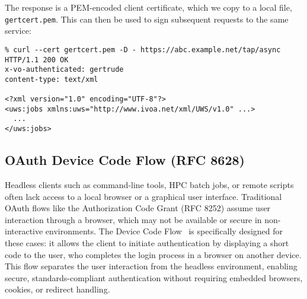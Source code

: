 \documentclass[11pt,a4paper]{ivoa}
\begin{document}
\noindent
The response is a PEM-encoded client certificate, which we copy
to a local file, \verb|gertcert.pem|.
This can then be used to sign subsequent requests to the same service:
{\footnotesize
\begin{verbatim}
% curl --cert gertcert.pem -D - https://abc.example.net/tap/async
HTTP/1.1 200 OK
x-vo-authenticated: gertrude
content-type: text/xml

<?xml version="1.0" encoding="UTF-8"?>
<uws:jobs xmlns:uws="http://www.ivoa.net/xml/UWS/v1.0" ...>
  ...
</uws:jobs>
\end{verbatim}
}

\subsection{OAuth Device Code Flow (RFC 8628)}

Headless clients such as command-line tools, HPC batch jobs, or remote scripts often lack access
to a local browser or a graphical user interface. Traditional OAuth flows like the Authorization
Code Grant (RFC 8252) assume user interaction through a browser, which may not be available or secure
in non-interactive environments. The Device Code Flow~\citep{rfc8628} is specifically designed for these cases:
it allows the client to initiate authentication by displaying a short code to the user, who completes the login
process in a browser on another device. This flow separates the user interaction from the headless environment,
enabling secure, standards-compliant authentication without requiring embedded browsers, cookies, or redirect handling.
\end{document}
